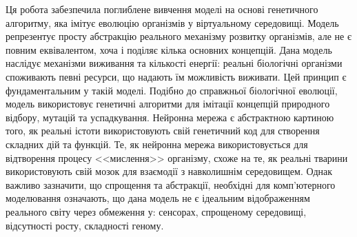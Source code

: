 Ця робота забезпечила поглиблене вивчення моделі на 
основі генетичного алгоритму,
яка імітує еволюцію організмів у віртуальному середовищі. 
Модель репрезентує просту абстракцію реального механізму розвитку організмів,
але не є повним еквівалентом, хоча і поділяє кілька основних концепцій.
Дана модель наслідує механізми виживання та кількості енергії:
реальні біологічні організми споживають певні ресурси, що надають їм можливість
виживати. Цей принцип є фундаментальним у такій моделі.
Подібно до справжньої біологічної еволюції, 
модель використовує генетичні алгоритми для імітації концепцій 
природного відбору, мутацій та успадкування. 
Нейронна мережа є абстрактною картиною того,
як реальні істоти використовують свій генетичний код
для створення складних дій та функцій.
Те, як нейронна мережа використовується
для відтворення процесу <<мислення>> організму,
схоже на те, як реальні тварини використовують
свій мозок для взаємодії з навколишнім середовищем.
Однак важливо зазначити, що спрощення та абстракції, 
необхідні для комп'ютерного моделювання означають, 
що дана модель не є ідеальним відображенням реального світу
через обмеження у: сенсорах, спрощеному середовищі,
відсутності росту, складності геному.






